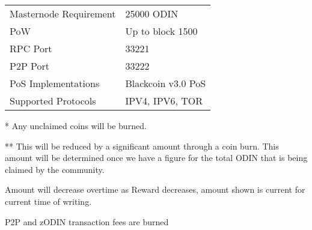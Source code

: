 \begin{center}
\begin{adjustbox}{max width=\textwidth}
\begin{threeparttable}
\begin{tabular}{p{6.5cm} p{8cm}}
Masternode Requirement  & \num{25000} ODIN \\

PoW                     & Up to block 1500 \\

RPC Port                & 33221 \\

P2P Port                & 33222 \\

PoS Implementations     & Blackcoin v3.0 PoS \\

Supported Protocols     & IPV4, IPV6, TOR \\
\hline 
\end{tabular}
\begin{tablenotes}
   \item[*] Any unclaimed coins will be burned.
   \item[**] This will be reduced by a significant amount through a coin burn. This amount will be determined once we have a figure for the total ODIN that is being claimed by the community.
   \item[\dag] Amount will decrease overtime as Reward decreases, amount shown is current for current time of writing.
   \item[\dag\dag] P2P and zODIN transaction fees are burned
\end{tablenotes}
\end{threeparttable}
\end{adjustbox}
\end{center}
\renewcommand{\arraystretch}{1}

 
